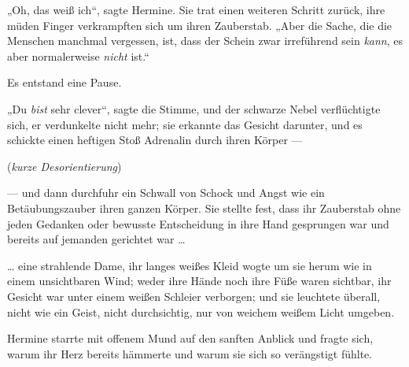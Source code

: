 „Oh, das weiß ich“, sagte Hermine. Sie trat einen weiteren Schritt zurück, ihre müden Finger verkrampften sich um ihren Zauberstab.
„Aber die Sache, die die Menschen manchmal vergessen, ist, dass der Schein zwar irreführend sein \emph{kann}, es aber normalerweise \emph{nicht} ist.“

Es entstand eine Pause.

„Du \emph{bist} sehr clever“, sagte die Stimme, und der schwarze Nebel verflüchtigte sich, er verdunkelte nicht mehr; sie erkannte das Gesicht darunter, und es schickte einen heftigen Stoß Adrenalin durch ihren Körper —

(\emph{kurze Desorientierung})

— und dann durchfuhr ein Schwall von Schock und Angst wie ein Betäubungszauber ihren ganzen Körper. Sie stellte fest, dass ihr Zauberstab ohne jeden Gedanken oder bewusste Entscheidung in ihre Hand gesprungen war und bereits auf jemanden gerichtet war …

… eine strahlende Dame, ihr langes weißes Kleid wogte um sie herum wie in einem unsichtbaren Wind; weder ihre Hände noch ihre Füße waren sichtbar, ihr Gesicht war unter einem weißen Schleier verborgen; und sie leuchtete überall, nicht wie ein Geist, nicht durchsichtig, nur von weichem weißem Licht umgeben.

Hermine starrte mit offenem Mund auf den sanften Anblick und fragte sich, warum ihr Herz bereits hämmerte und warum sie sich so verängstigt fühlte.

